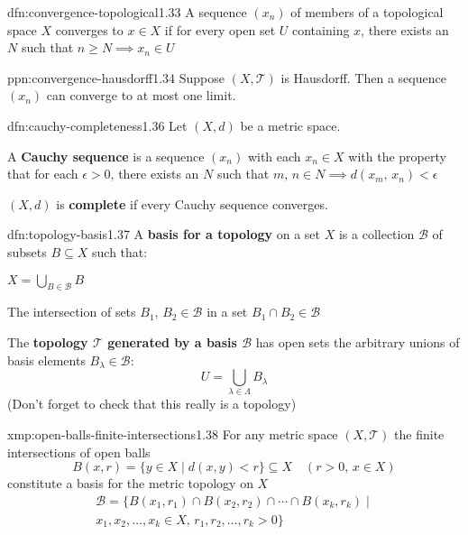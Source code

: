 \documentclass[landscape, 8pt]{extarticle}
\begin{document}
\begin{multicols}{3}
\begin{dfn}{dfn:convergence-topological}{1.33}
    A sequence $(x_{n})$ of members of a topological space $X$ converges to $x\in X$ if for every open set $U$ containing $x$, there exists an $N$ such that $n \ge N \implies x_{n} \in U$
\end{dfn}

\begin{ppn}{ppn:convergence-hausdorff}{1.34}
    Suppose $(X, \mathcal{T})$ is Hausdorff. Then a sequence $(x_{n})$ can converge to at most one limit.
\end{ppn}

\begin{dfn}{dfn:cauchy-completeness}{1.36}
    Let $(X, d)$ be a metric space.
    \begin{enumerate-tight}
        \item A \textbf{Cauchy sequence} is a sequence $(x_{n})$ with each $x_{n}\in X$ with the property that for each $\epsilon > 0$, there exists an $N$ such that $m,\,n\in N \implies d(x_{m},\,x_{n})< \epsilon$
        \item $(X, d)$ is \textbf{complete} if every Cauchy sequence converges.
    \end{enumerate-tight}
\end{dfn}

\begin{dfn}{dfn:topology-basis}{1.37}
    A \textbf{basis for a topology} on a set $X$ is a collection $\mathcal{B}$ of subsets $B \subseteq X$ such that:
    \begin{enumerate-tight}
        \item $X = \bigcup_{B\in \mathcal{B}} B$
        \item The intersection of sets $B_{1},\,B_{2}\in \mathcal{B}$ in a set $B_{1} \cap B_{2} \in \mathcal{B}$
    \end{enumerate-tight}

    \longrule{0.08ex}
    The \textbf{topology $\mathcal{T}$ generated by a basis $\mathcal{B}$} has open sets the arbitrary unions of basis elements $B_{\lambda} \in \mathcal{B}$:
    \[U = \bigcup_{\lambda\in \Lambda} B_{\lambda}\]
    (Don't forget to check that this really is a topology)
\end{dfn}

\begin{xmp}{xmp:open-balls-finite-intersections}{1.38}
    For any metric space $(X, \mathcal{T})$ the finite intersections of open balls
    \[B(x,r) = \{y \in X \mid d(x, y) < r\} \subseteq X \quad (r > 0,\, x\in X)\]
    constitute a basis for the metric topology on $X$
    \begin{multline*}
        \mathcal{B} = \{B(x_{1},r_{1}) \cap B(x_{2},r_{2}) \cap \cdots \cap B(x_{k}, r_{k}) \mid \\
        x_{1},x_{2},\dots,x_{k}\in X,\,r_{1},r_{2},\dots,r_{k}>0\}
    \end{multline*}
\end{xmp}


\end{multicols}
\end{document}
